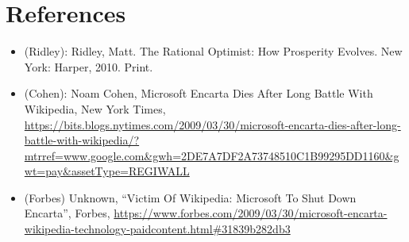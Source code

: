 \section*{References}

\begin{itemize}

\item (Ridley): Ridley, Matt. The Rational Optimist: How Prosperity Evolves. New York: Harper, 2010. Print.

\item (Cohen): Noam Cohen, Microsoft Encarta Dies After Long Battle With Wikipedia, New York Times, \url{https://bits.blogs.nytimes.com/2009/03/30/microsoft-encarta-dies-after-long-battle-with-wikipedia/?mtrref=www.google.com&gwh=2DE7A7DF2A73748510C1B99295DD1160&gwt=pay&assetType=REGIWALL}

\item (Forbes) Unknown, ``Victim Of Wikipedia: Microsoft To Shut Down Encarta'', Forbes, \url{https://www.forbes.com/2009/03/30/microsoft-encarta-wikipedia-technology-paidcontent.html#31839b282db3}

\end{itemize}
